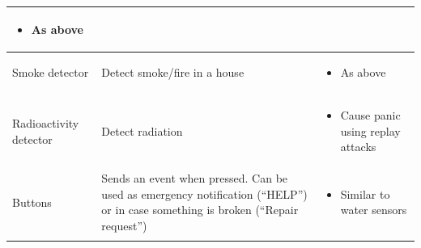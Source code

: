{\begin{longtable}[c]{|l|l|l|}
\begin{minipage}[t]{0.40\columnwidth}
\begin{itemize}
\tightlist
\item
  {As above}
\end{itemize}
\strut\end{minipage}\tabularnewline
\hline
\begin{minipage}[t]{0.20\columnwidth}\raggedright\strut
{Smoke detector}
\strut\end{minipage} &
\begin{minipage}[t]{0.30\columnwidth}\raggedright\strut
{Detect smoke/fire in a house}
\strut\end{minipage} &
\begin{minipage}[t]{0.40\columnwidth}\raggedright\strut
\begin{itemize}
\tightlist
\item
  {As above}
\end{itemize}
\strut\end{minipage}\tabularnewline
\hline
\begin{minipage}[t]{0.20\columnwidth}\raggedright\strut
{Radioactivity detector}
\strut\end{minipage} &
\begin{minipage}[t]{0.30\columnwidth}\raggedright\strut
{Detect radiation}
\strut\end{minipage} &
\begin{minipage}[t]{0.40\columnwidth}\raggedright\strut
\begin{itemize}
\tightlist
\item
  {Cause panic using replay attacks}
\end{itemize}
\strut\end{minipage}\tabularnewline
\hline
\begin{minipage}[t]{0.20\columnwidth}\raggedright\strut
{Buttons}
\strut\end{minipage} &
\begin{minipage}[t]{0.30\columnwidth}\raggedright\strut
{Sends an event when pressed. Can be used as emergency notification
(``HELP'') or in case something is broken (``Repair request'')}
\strut\end{minipage} &
\begin{minipage}[t]{0.40\columnwidth}\raggedright\strut
\begin{itemize}
\tightlist
\item
  {Similar to water sensors}
\end{itemize}
\strut\end{minipage}\tabularnewline
\hline
\begin{minipage}[t]{0.20\columnwidth}\raggedright\strut

\end{minipage}
\end{longtable}}
